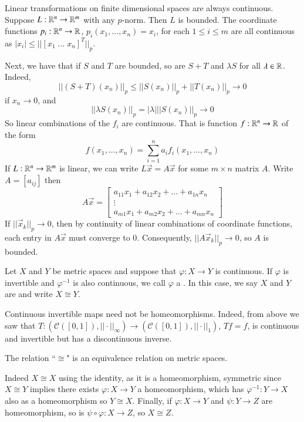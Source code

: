 \begin{eg}
    Linear transformations on finite dimensional spaces are always continuous. Suppose $L:\mathbb R^n\rightarrow \mathbb R^m$ with any $p$-norm. Then $L$ is bounded. The coordinate functions $p_i:\mathbb R^n\rightarrow \mathbb R$, $p_i(x_1,...,x_n) = x_i$, for each $1 \leq i \leq m$ are all continuous as $|x_i| \leq ||[x_1\;...\;x_n]^T||_p$. 

    Next, we have that if $S$ and $T$ are bounded, so are $S+T$ and $\lambda S$ for all $\lambda \in \mathbb R$. Indeed, $$||(S+T)(x_n)||_p \leq ||S(x_n)||_p+||T(x_n)||_p\rightarrow 0$$ if $x_n\rightarrow 0$, and $$||\lambda S(x_n)||_p = |\lambda |||S(x_n)||_p\rightarrow 0$$ So linear combinations of the $f_i$ are continuous. That is function $f:\mathbb R^n\rightarrow \mathbb R$ of the form $$f(x_1,...,x_n) = \sum_{i=1}^na_if_i(x_1,...,x_n)$$ If $L:\mathbb R^n\rightarrow \mathbb R^m$ is linear, we can write $L\vec{x} = A\vec{x}$ for some $m\times n$ matrix $A$. Write $A = [a_{ij}]$ then $$A\vec{x} = \begin{bmatrix} a_{11}x_1+a_{12}x_2+...+a_{1n}x_n \\ \vdots \\ a_{m1}x_1+a_{m2}x_2 + ... + a_{mn}x_n\end{bmatrix}$$ If $||\vec{x}_k||_p\rightarrow 0$, then by continuity of linear combinations of coordinate functions, each entry in $A\vec{x}$ must converge to $0$. Consequently, $||A\vec{x}_k||_p\rightarrow 0$, so $A$ is bounded.
\end{eg}


\begin{defn}
     Let $X$ and $Y$ be metric spaces and suppose that $\varphi:X\rightarrow Y$ is continuous. If $\varphi$ is invertible and $\varphi^{-1}$ is also continuous, we call $\varphi$ a . In this case, we say $X$ and $Y$ are  and write $X\cong Y$.
\end{defn}

\begin{eg}
    Continuous invertible maps need not be homeomorphisms. Indeed, from above we saw that $T:(\mathcal{C}([0,1]),||\cdot||_{\infty})\rightarrow (\mathcal{C}([0,1]),||\cdot||_1)$, $Tf= f$, is continuous and invertible but has a discontinuous inverse.
\end{eg}

\begin{prop}
    The relation ``$\cong$" is an equivalence relation on metric spaces.
\end{prop}
Indeed $X\cong X$ using the identity, as it is a homeomorphism, symmetric since $X\cong Y$ implies there exists $\varphi:X\rightarrow Y$ a homeomorphism, which has $\varphi^{-1}:Y\rightarrow X$ also as a homeomorphism so $Y\cong X$. Finally, if $\varphi:X\rightarrow Y$ and $\psi:Y\rightarrow Z$ are homeomorphism, so is $\psi\circ\varphi:X\rightarrow Z$, so $X\cong Z$.

